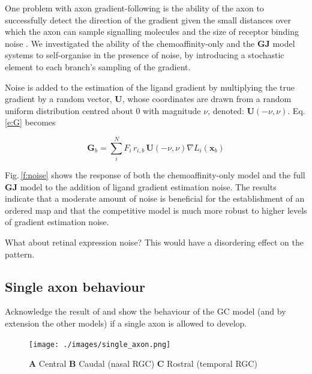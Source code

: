 \documentclass[11pt, a4paper]{article}
\begin{document}
One problem with axon gradient-following is the ability of the axon to
successfully detect the direction of the gradient given the small distances
over which the axon can sample signalling molecules and the size of receptor
binding noise \citep{goodhill_noise_2014}.  We investigated the ability of the
chemoaffinity-only and the $\mathbf{GJ}$ model systems to self-organise in the
presence of noise, by introducing a stochastic element to each branch's
sampling of the gradient.

Noise is added to the estimation of the ligand gradient by multiplying the
true gradient by a random vector, $\mathbf{U}$, whose coordinates are drawn
from a random uniform distribution centred about 0 with magnitude $\nu$,
denoted: $\mathbf{U}(-\nu, \nu)$. Eq.\,\ref{e:G} becomes

\begin{equation}\label{e:Gnu}
\mathbf{G}_b = \sum_i^N F_i\,r_{i,b}\, \mathbf{U}(-\nu, \nu) \nabla L_i(\mathbf{x}_b)
\end{equation}

Fig.\,\ref{f:noise} shows the response of both the chemoaffinity-only model
and the full $\mathbf{GJ}$ model to the addition of ligand gradient estimation
noise. The results indicate that a moderate amount of noise is beneficial for
the establishment of an ordered map and that the competitive model is much
more robust to higher levels of gradient estimation noise.

What about retinal expression noise? This would have a disordering effect on
the pattern.


\subsection*{Single axon behaviour}

Acknowledge the result of \citet{gosse_retinotopic_2008} and show the
behaviour of the GC model (and by extension the other models) if a single axon
is allowed to develop.

\begin{figure}
\centering
\texttt{[image: ./images/single\_axon.png]}
\caption{ \textbf{A} Central \textbf{B} Caudal (nasal RGC) \textbf{C} Rostral
(temporal RGC)}
\label{f:single}
\end{figure}
\end{document}

